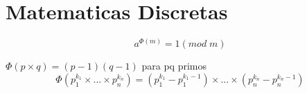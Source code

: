 \newpage
\section{Matematicas Discretas}
$$ a^{\Phi(m)} = 1 (mod \; m) $$
\begin{center}
$\Phi(p \times q) = (p-1)(q-1)$ para pq primos
	$$\Phi(p_1^{k_1} \times ... \times p_n^{k_n}) = (p_1^{k_1} - p_1^{k_1 - 1} ) \times ... \times (p_n^{k_n} - p_n^{k_n - 1} )  $$
	

\end{center}
